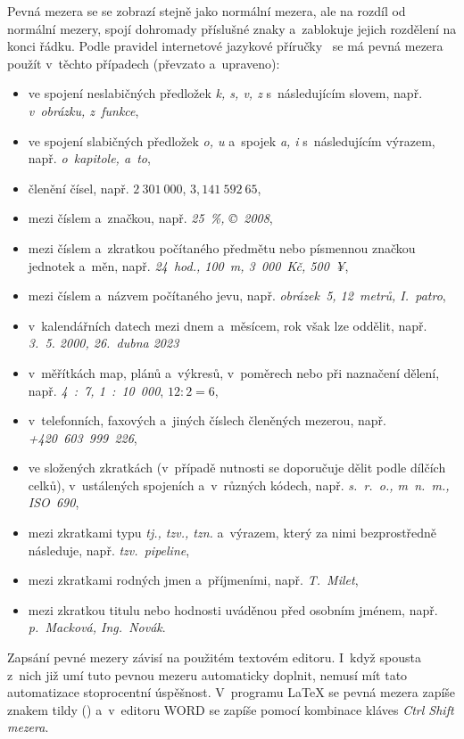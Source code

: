 Pevná mezera se se zobrazí stejně jako normální mezera, ale na rozdíl od normální
mezery, spojí dohromady příslušné znaky a~zablokuje jejich rozdělení na konci
řádku. Podle pravidel internetové jazykové příručky~\cite{Ustav_pro_jazyk_cesky}
se má pevná mezera použít v~těchto případech (převzato a~upraveno):
\begin{itemize}
    \item ve spojení neslabičných předložek \emph{k, s, v, z} s~následujícím
    slovem, např. \emph{v~obrázku, z~funkce},
    \item ve spojení slabičných předložek \emph{o, u} a~spojek \emph{a, i}
    s~následujícím výrazem, např. \emph{o~kapitole, a~to},
    \item členění čísel, např. $\mathit{2~301~000}$, $\mathit{3,141~592~65}$,
    \item mezi číslem a~značkou, např. \emph{25~\%, \copyright~2008},
    \item mezi číslem a~zkratkou počítaného předmětu nebo písmennou značkou
    jednotek a~měn, např. \emph{24~hod., 100~m, 3~000~Kč, 500~¥},
    \item mezi číslem a~názvem počítaného jevu, např. \emph{obrázek~5, 12~metrů,
    I.~patro},
    \item v~kalendářních datech mezi dnem a~měsícem, rok však lze oddělit, např.
    \emph{3.~5. 2000, 26.~dubna 2023}
    \item v~měřítkách map, plánů a~výkresů, v~poměrech nebo při naznačení dělení,
    např. \emph{4~:~7, 1~:~10~000}, $\mathit{12:2=6}$,
    \item v~telefonních, faxových a~jiných číslech členěných mezerou, např. 
    \emph{+420~603~999~226},
    \item ve složených zkratkách (v~případě nutnosti se doporučuje dělit podle
    dílčích celků), v~ustálených spojeních a~v~různých kódech, např.
    \emph{s.~r.~o., m~n.~m., ISO~690},
    \item mezi zkratkami typu \emph{tj., tzv., tzn.} a~výrazem, který za nimi
    bezprostředně následuje, např. \emph{tzv.~pipeline},
    \item mezi zkratkami rodných jmen a~příjmeními, např. \emph{T.~Milet},
    \item mezi zkratkou titulu nebo hodnosti uváděnou před osobním jménem, např.
    \emph{p.~Macková, Ing.~Novák}.
\end{itemize}

Zapsání pevné mezery závisí na použitém textovém editoru. I~když spousta z~nich
již umí tuto pevnou mezeru automaticky doplnit, nemusí mít tato automatizace
stoprocentní úspěšnost. V~programu {\LaTeX} se pevná mezera zapíše znakem tildy
(\texttildelow) a~v~editoru WORD se zapíše pomocí kombinace kláves
\emph{Ctrl Shift mezera}.

